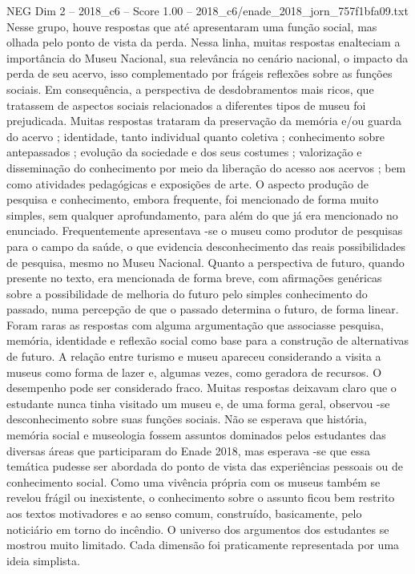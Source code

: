 \begin{textsample}{NEG Dim 2 – 2018\_c6 – Score 1.00 – 2018\_c6/enade\_2018\_jorn\_757f1bfa09.txt}
Nesse grupo, houve respostas que até apresentaram uma função social, mas olhada pelo ponto de vista da perda.
Nessa linha, muitas respostas enalteciam a importância do Museu Nacional, sua relevância no cenário nacional, o impacto da perda de seu acervo, isso complementado por frágeis reflexões sobre as funções sociais.
Em consequência, a perspectiva de desdobramentos mais ricos, que tratassem de aspectos sociais relacionados a diferentes tipos de museu foi prejudicada.
Muitas respostas trataram da preservação da memória e/ou guarda do acervo ; identidade, tanto individual quanto coletiva ; conhecimento sobre antepassados ; evolução da sociedade e dos seus costumes ; valorização e disseminação do conhecimento por meio da liberação do acesso aos acervos ; bem como atividades pedagógicas e exposições de arte.
O aspecto produção de pesquisa e conhecimento, embora frequente, foi mencionado de forma muito simples, sem qualquer aprofundamento, para além do que já era mencionado no enunciado.
Frequentemente apresentava -se o museu como produtor de pesquisas para o campo da saúde, o que evidencia desconhecimento das reais possibilidades de pesquisa, mesmo no Museu Nacional.
Quanto a perspectiva de futuro, quando presente no texto, era mencionada de forma breve, com afirmações genéricas sobre a possibilidade de melhoria do futuro pelo simples conhecimento do passado, numa percepção de que o passado determina o futuro, de forma linear.
Foram raras as respostas com alguma argumentação que associasse pesquisa, memória, identidade e reflexão social como base para a construção de alternativas de futuro.
A relação entre turismo e museu apareceu considerando a visita a museus como forma de lazer e, algumas vezes, como geradora de recursos.
O desempenho pode ser considerado fraco.
Muitas respostas deixavam claro que o estudante nunca tinha visitado um museu e, de uma forma geral, observou -se desconhecimento sobre suas funções sociais.
Não se esperava que história, memória social e museologia fossem assuntos dominados pelos estudantes das diversas áreas que participaram do Enade 2018, mas esperava -se que essa temática pudesse ser abordada do ponto de vista das experiências pessoais ou de conhecimento social.
Como uma vivência própria com os museus também se revelou frágil ou inexistente, o conhecimento sobre o assunto ficou bem restrito aos textos motivadores e ao senso comum, construído, basicamente, pelo noticiário em torno do incêndio.
O universo dos argumentos dos estudantes se mostrou muito limitado.
Cada dimensão foi praticamente representada por uma ideia simplista.

\end{textsample}
